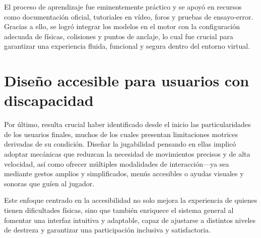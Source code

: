 El proceso de aprendizaje fue eminentemente práctico y se apoyó en recursos como documentación oficial, tutoriales en vídeo, foros y pruebas de ensayo-error. Gracias a ello, se logró integrar los modelos en el motor con la configuración adecuada de físicas, colisiones y puntos de anclaje, lo cual fue crucial para garantizar una experiencia fluida, funcional y segura dentro del entorno virtual.

\section{Diseño accesible para usuarios con discapacidad}

Por último, resulta crucial haber identificado desde el inicio las particularidades de los usuarios finales, muchos de los cuales presentan limitaciones motrices derivadas de su condición. Diseñar la jugabilidad pensando en ellas implicó adoptar mecánicas que reduzcan la necesidad de movimientos precisos y de alta velocidad, así como ofrecer múltiples modalidades de interacción—ya sea mediante gestos amplios y simplificados, menús accesibles o ayudas visuales y sonoras que guíen al jugador.

Este enfoque centrado en la accesibilidad no solo mejora la experiencia de quienes tienen dificultades físicas, sino que también enriquece el sistema general al fomentar una interfaz intuitiva y adaptable, capaz de ajustarse a distintos niveles de destreza y garantizar una participación inclusiva y satisfactoria.